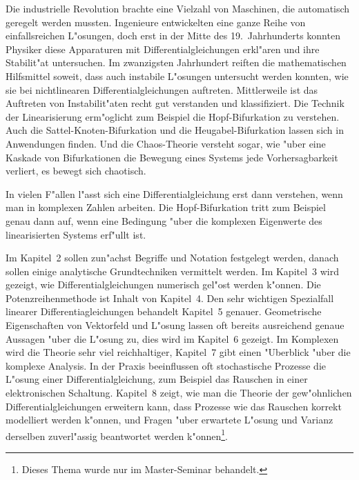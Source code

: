 Die industrielle Revolution brachte eine Vielzahl von Maschinen,
%
die automatisch geregelt werden mussten.
Ingenieure entwickelten eine ganze Reihe von einfallsreichen L"osungen,
doch erst in der Mitte des 19.~Jahrhunderts konnten Physiker diese
Apparaturen mit Differentialgleichungen erkl"aren und ihre Stabilit"at
untersuchen.
Im zwanzigsten Jahrhundert reiften die mathematischen Hilfsmittel
soweit, dass auch instabile L"osungen untersucht werden konnten,
wie sie bei nichtlinearen Differentialgleichungen auftreten.
Mittlerweile ist das Auftreten von Instabilit"aten recht gut verstanden
und klassifiziert. 
Die Technik der Linearisierung erm"oglicht zum Beispiel die
Hopf-Bifurkation zu verstehen.
%
%
Auch die Sattel-Knoten-Bifurkation und die Heugabel-Bifurkation
lassen sich in Anwendungen finden.
%
%
%
%
Und die Chaos-Theorie versteht sogar, wie "uber eine Kaskade von
Bifurkationen die Bewegung eines Systems jede Vorhersagbarkeit verliert,
es bewegt sich chaotisch.
%

In vielen F"allen l"asst sich eine Differentialgleichung erst dann
verstehen, wenn man in komplexen Zahlen arbeiten. 
Die Hopf-Bifurkation tritt zum Beispiel genau dann auf, wenn eine
Bedingung "uber die komplexen Eigenwerte des linearisierten Systems
erf"ullt ist.

Im Kapitel~2 sollen zun"achst Begriffe und Notation festgelegt werden,
danach sollen einige analytische Grundtechniken vermittelt werden.
Im Kapitel~3 wird gezeigt, wie Differentialgleichungen numerisch
gel"ost werden k"onnen.
Die Potenzreihenmethode ist Inhalt von Kapitel~4. 
Den sehr wichtigen Spezialfall linearer Differentiagleichungen
behandelt Kapitel~5 genauer.
Geometrische Eigenschaften von Vektorfeld und L"osung lassen oft
bereits ausreichend genaue Aussagen "uber die L"osung zu,  dies wird
im Kapitel~6 gezeigt.
Im Komplexen wird die Theorie sehr viel reichhaltiger, Kapitel~7 gibt
einen "Uberblick "uber die komplexe Analysis.
In der Praxis beeinflussen oft stochastische Prozesse die L"osung einer
Differentialgleichung, zum Beispiel das Rauschen in einer elektronischen
Schaltung.
Kapitel~8 zeigt, wie man die Theorie der gew"ohnlichen Differentialgleichungen
erweitern kann, dass Prozesse wie das Rauschen korrekt modelliert 
werden k"onnen, und Fragen "uber erwartete L"osung und Varianz
derselben zuverl"assig beantwortet werden k"onnen\footnote{Dieses Thema
wurde nur im Master-Seminar behandelt.}.


